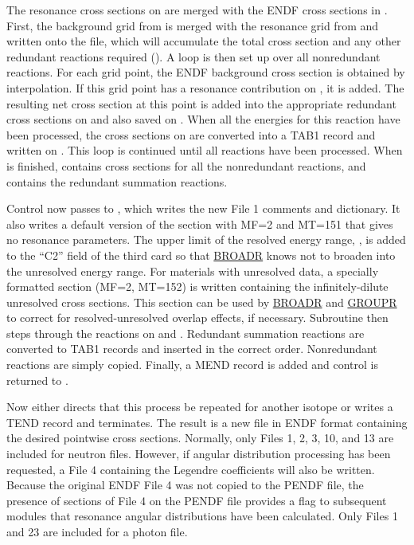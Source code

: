 The resonance cross sections on  are merged with the
ENDF cross sections in .
First, the background grid from
 is merged with the
resonance grid from  and
written onto the  file, which will
accumulate the total cross section and any other
redundant reactions required ().  A loop is then
set up over all nonredundant reactions.  For each grid point, the
ENDF background cross section is obtained by interpolation.  If
this grid point has a resonance contribution on , it
is added.  The resulting net cross section at this point is added
into the appropriate redundant cross sections on
 and also saved on .  When all the
energies for this reaction have been processed, the cross
sections on  are converted into a TAB1 record and
written on .  This loop is continued until all
reactions have been processed.  When  is finished,
 contains cross sections for all the nonredundant
reactions, and  contains the redundant summation
reactions.

Control now passes to ,
which writes the new File 1 comments and dictionary.  It also
writes a default version of the section with MF=2 and  MT=151
that gives no resonance parameters.  The upper limit
of the resolved energy range, , is added to the
``C2'' field of the third card so that \hyperlink{sBROADRhy}{BROADR}
 knows
not to broaden into the unresolved energy range.  For materials with
unresolved data, a specially formatted section (MF=2, MT=152) is
written containing the infinitely-dilute unresolved cross
sections.  This section can be used by \hyperlink{sBROADRhy}{BROADR}
and \hyperlink{sGROUPRhy}{GROUPR}
to correct for resolved-unresolved overlap effects, if necessary.
Subroutine  then steps through the reactions on
 and .  Redundant summation reactions
are converted to TAB1 records and inserted in the correct order.
Nonredundant reactions are simply copied.  Finally, a MEND
record is added and control is returned to .

Now  either directs that this process be repeated
for another isotope or writes a TEND record and terminates.  The
result is a new file in ENDF format containing the desired
pointwise cross sections.  Normally, only Files 1, 2, 3, 10, and
13 are included for neutron files.  However, if angular
distribution processing has been requested, a File 4 containing
the Legendre coefficients will also be written.  Because the
original ENDF File 4 was not copied to the PENDF file, the
presence of sections of File 4 on the PENDF file provides a
flag to subsequent modules that resonance angular distributions
 have been calculated.
Only Files 1 and 23 are included for a photon file.

